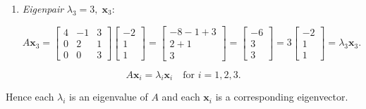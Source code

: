\documentclass{report}
\begin{document}
{\begin{enumerate}[label=(\alph*)]
              \[
                  A\mathbf{x}_2
                  =\begin{bmatrix}
                      4 & -1 & 3 \\
                      0 & 2  & 1 \\
                      0 & 0  & 3
                  \end{bmatrix}
                  \begin{bmatrix}1\\2\\0\end{bmatrix}
                  =\begin{bmatrix}4-2\\4\\0\end{bmatrix}
                  =\begin{bmatrix}2\\4\\0\end{bmatrix}
                  =2\begin{bmatrix}1\\2\\0\end{bmatrix}
                  =\lambda_2\mathbf{x}_2.
              \]

        \item \emph{Eigenpair} \(\lambda_3 = 3,\; \mathbf{x}_3\):

              \[
                  A\mathbf{x}_3
                  =\begin{bmatrix}
                      4 & -1 & 3 \\
                      0 & 2  & 1 \\
                      0 & 0  & 3
                  \end{bmatrix}
                  \begin{bmatrix}-2\\1\\1\end{bmatrix}
                  =\begin{bmatrix}-8-1+3\\2+1\\3\end{bmatrix}
                  =\begin{bmatrix}-6\\3\\3\end{bmatrix}
                  =3\begin{bmatrix}-2\\1\\1\end{bmatrix}
                  =\lambda_3\mathbf{x}_3.
              \]
    \end{enumerate}

    \[
        A\mathbf{x}_i=\lambda_i\mathbf{x}_i\quad\text{for }i=1,2,3.
    \]

    Hence each \(\lambda_i\) is an eigenvalue of \(A\) and each \(\mathbf{x}_i\) is
    a corresponding eigenvector.

}
\end{document}
